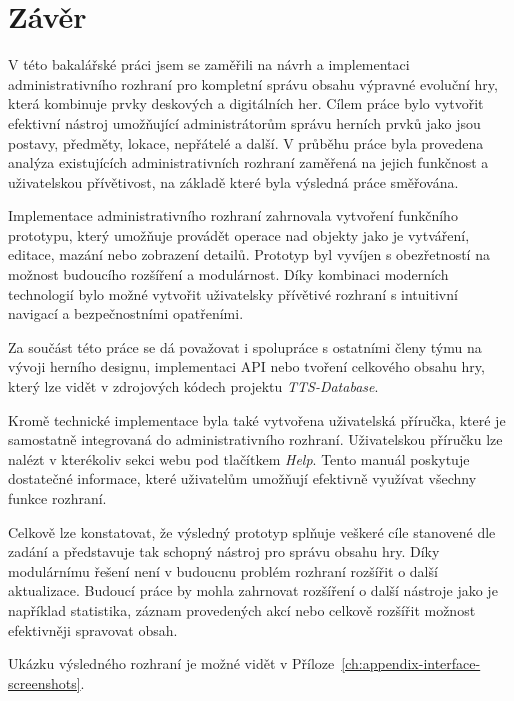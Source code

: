 \chapter{Závěr}
\label{ch:conclusion}

V této bakalářské práci jsem se zaměřili na návrh a implementaci administrativního rozhraní pro kompletní správu obsahu výpravné evoluční hry, která kombinuje prvky deskových a digitálních her. Cílem práce bylo vytvořit efektivní nástroj umožňující administrátorům správu herních prvků jako jsou postavy, předměty, lokace, nepřátelé a další. V průběhu práce byla provedena analýza existujících administrativních rozhraní zaměřená na jejich funkčnost a uživatelskou přívětivost, na základě které byla výsledná práce směřována.

Implementace administrativního rozhraní zahrnovala vytvoření funkčního prototypu, který umožňuje provádět operace nad objekty jako je vytváření, editace, mazání nebo zobrazení detailů. Prototyp byl vyvíjen s obezřetností na možnost budoucího rozšíření a modulárnost. Díky kombinaci moderních technologií bylo možné vytvořit uživatelsky přívětivé rozhraní s intuitivní navigací a bezpečnostními opatřeními.

Za součást této práce se dá považovat i spolupráce s ostatními členy týmu na vývoji herního designu, implementaci API nebo tvoření celkového obsahu hry, který lze vidět v zdrojových kódech projektu \textit{TTS-Database}.

Kromě technické implementace byla také vytvořena uživatelská příručka, které je samostatně integrovaná do administrativního rozhraní. Uživatelskou příručku lze nalézt v kterékoliv sekci webu pod tlačítkem \textit{Help}. Tento manuál poskytuje dostatečné informace, které uživatelům umožňují efektivně využívat všechny funkce rozhraní.

Celkově lze konstatovat, že výsledný prototyp splňuje veškeré cíle stanovené dle zadání a představuje tak schopný nástroj pro správu obsahu hry. Díky modulárnímu řešení není v budoucnu problém rozhraní rozšířit o další aktualizace. Budoucí práce by mohla zahrnovat rozšíření o další nástroje jako je například statistika, záznam provedených akcí nebo celkově rozšířit možnost efektivněji spravovat obsah.

Ukázku výsledného rozhraní je možné vidět v Příloze~\ref{ch:appendix-interface-screenshots}.

\endinput